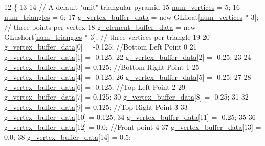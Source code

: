 \begin{DoxyCode}
12                                         \{
13 
14   \textcolor{comment}{// A default "unit" triangular pyramid}
15   \hyperlink{classGameAsset_a3e8d7dc58d3d4efafbbce1536b78dbc7}{num\_vertices} = 5;
16   \hyperlink{classGameAsset_aae4d864335c2eca685cc86602881cd18}{num\_triangles} = 6;
17   \hyperlink{classGameAsset_ae1d682ecf84d9cd3f91a8c870acf2777}{g\_vertex\_buffer\_data} = \textcolor{keyword}{new} GLfloat[\hyperlink{classGameAsset_a3e8d7dc58d3d4efafbbce1536b78dbc7}{num\_vertices} * 3]; \textcolor{comment}{// three points per
       vertex}
18   \hyperlink{classGameAsset_ab859393c9158c8bda39cd100475fee25}{g\_element\_buffer\_data} = \textcolor{keyword}{new} GLushort[\hyperlink{classGameAsset_aae4d864335c2eca685cc86602881cd18}{num\_triangles} * 3]; \textcolor{comment}{// three
       vertices per triangle}
19 
20   \hyperlink{classGameAsset_ae1d682ecf84d9cd3f91a8c870acf2777}{g\_vertex\_buffer\_data}[0]  = -0.125; \textcolor{comment}{//Bottom Left Point 0}
21   \hyperlink{classGameAsset_ae1d682ecf84d9cd3f91a8c870acf2777}{g\_vertex\_buffer\_data}[1]  = -0.125;
22   \hyperlink{classGameAsset_ae1d682ecf84d9cd3f91a8c870acf2777}{g\_vertex\_buffer\_data}[2]  = -0.25;
23 
24   \hyperlink{classGameAsset_ae1d682ecf84d9cd3f91a8c870acf2777}{g\_vertex\_buffer\_data}[3]  =  0.125;  \textcolor{comment}{//Bottom Right Point 1}
25   \hyperlink{classGameAsset_ae1d682ecf84d9cd3f91a8c870acf2777}{g\_vertex\_buffer\_data}[4]  = -0.125;
26   \hyperlink{classGameAsset_ae1d682ecf84d9cd3f91a8c870acf2777}{g\_vertex\_buffer\_data}[5]  = -0.25;
27 
28   \hyperlink{classGameAsset_ae1d682ecf84d9cd3f91a8c870acf2777}{g\_vertex\_buffer\_data}[6]  = -0.125;  \textcolor{comment}{//Top Left Point 2}
29   \hyperlink{classGameAsset_ae1d682ecf84d9cd3f91a8c870acf2777}{g\_vertex\_buffer\_data}[7]  =  0.125;
30   \hyperlink{classGameAsset_ae1d682ecf84d9cd3f91a8c870acf2777}{g\_vertex\_buffer\_data}[8]  = -0.25;
31 
32   \hyperlink{classGameAsset_ae1d682ecf84d9cd3f91a8c870acf2777}{g\_vertex\_buffer\_data}[9]  =  0.125;  \textcolor{comment}{//Top Right Point 3}
33   \hyperlink{classGameAsset_ae1d682ecf84d9cd3f91a8c870acf2777}{g\_vertex\_buffer\_data}[10] =  0.125;
34   \hyperlink{classGameAsset_ae1d682ecf84d9cd3f91a8c870acf2777}{g\_vertex\_buffer\_data}[11] = -0.25;
35  
36   \hyperlink{classGameAsset_ae1d682ecf84d9cd3f91a8c870acf2777}{g\_vertex\_buffer\_data}[12] =  0.0;  \textcolor{comment}{//Front point 4}
37   \hyperlink{classGameAsset_ae1d682ecf84d9cd3f91a8c870acf2777}{g\_vertex\_buffer\_data}[13] =  0.0;
38   \hyperlink{classGameAsset_ae1d682ecf84d9cd3f91a8c870acf2777}{g\_vertex\_buffer\_data}[14] =  0.5;

\end{DoxyCode}
